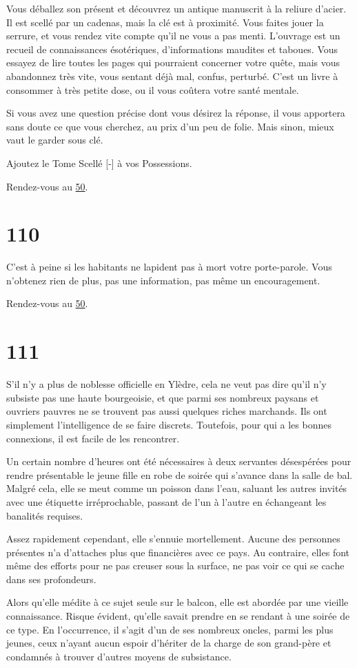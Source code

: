 \documentclass{report}
\newcommand{\gsection}[1]{
    \section{#1}
    \label{section-#1}
}
\newcommand{\glink}[1]{\hyperref[section-#1]{#1}}
\begin{document}
Vous déballez son présent et découvrez un antique manuscrit à la reliure d'acier. Il est scellé par un cadenas, mais la clé est à proximité. Vous faites jouer la serrure, et vous rendez vite compte qu'il ne vous a pas menti. L'ouvrage est un recueil de connaissances ésotériques, d'informations maudites et taboues. Vous essayez de lire toutes les pages qui pourraient concerner votre quête, mais vous abandonnez très vite, vous sentant déjà mal, confus, perturbé. C'est un livre à consommer à très petite dose, ou il vous coûtera votre santé mentale.

Si vous avez une question précise dont vous désirez la réponse, il vous apportera sans doute ce que vous cherchez, au prix d'un peu de folie. Mais sinon, mieux vaut le garder sous clé.

Ajoutez le Tome Scellé [-] à vos Possessions.

Rendez-vous au \glink{50}.

\gsection{110}

C'est à peine si les habitants ne lapident pas à mort votre porte-parole. Vous n'obtenez rien de plus, pas une information, pas même un encouragement.

Rendez-vous au \glink{50}.

\gsection{111}

S'il n'y a plus de noblesse officielle en Ylèdre, cela ne veut pas dire qu'il n'y subsiste pas une haute bourgeoisie, et que parmi ses nombreux paysans et ouvriers pauvres ne se trouvent pas aussi quelques riches marchands. Ils ont simplement l'intelligence de se faire discrets. Toutefois, pour qui a les bonnes connexions, il est facile de les rencontrer.

Un certain nombre d'heures ont été nécessaires à deux servantes désespérées pour rendre présentable le jeune fille en robe de soirée qui s'avance dans la salle de bal. Malgré cela, elle se meut comme un poisson dans l'eau, saluant les autres invités avec une étiquette irréprochable, passant de l'un à l'autre en échangeant les banalités requises.

Assez rapidement cependant, elle s'ennuie mortellement. Aucune des personnes présentes n'a d'attaches plus que financières avec ce pays. Au contraire, elles font même des efforts pour ne pas creuser sous la surface, ne pas voir ce qui se cache dans ses profondeurs.

Alors qu'elle médite à ce sujet seule sur le balcon, elle est abordée par une vieille connaissance. Risque évident, qu'elle savait prendre en se rendant à une soirée de ce type. En l’occurrence, il s'agit d'un de ses nombreux oncles, parmi les plus jeunes, ceux n'ayant aucun espoir d'hériter de la charge de son grand-père et condamnés à trouver d'autres moyens de subsistance.
\end{document}

